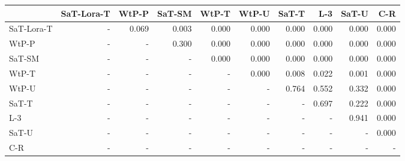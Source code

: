 \begin{tabular}{lrrrrrrrrr}
\toprule
 & SaT-Lora-T & WtP-P & SaT-SM & WtP-T & WtP-U & SaT-T & L-3 & SaT-U & C-R \\
\midrule
SaT-Lora-T & - & 0.069 & 0.003 & 0.000 & 0.000 & 0.000 & 0.000 & 0.000 & 0.000 \\
WtP-P & - & - & 0.300 & 0.000 & 0.000 & 0.000 & 0.000 & 0.000 & 0.000 \\
SaT-SM & - & - & - & 0.000 & 0.000 & 0.000 & 0.000 & 0.000 & 0.000 \\
WtP-T & - & - & - & - & 0.000 & 0.008 & 0.022 & 0.001 & 0.000 \\
WtP-U & - & - & - & - & - & 0.764 & 0.552 & 0.332 & 0.000 \\
SaT-T & - & - & - & - & - & - & 0.697 & 0.222 & 0.000 \\
L-3 & - & - & - & - & - & - & - & 0.941 & 0.000 \\
SaT-U & - & - & - & - & - & - & - & - & 0.000 \\
C-R & - & - & - & - & - & - & - & - & - \\
\bottomrule
\end{tabular}

